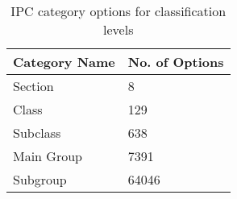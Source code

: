 \begin{table}[h]

\centering

\begin{tabular}{@{}l|l@{}}
\toprule
Category Name & No. of Options \\ \midrule
Section       & 8              \\
Class         & 129            \\
Subclass      & 638            \\
Main Group    & 7391           \\
Subgroup      & 64046          \\ \bottomrule
\end{tabular}
\caption{IPC category options for classification levels}
\label{tab:ipc_classification_counts}
\end{table}